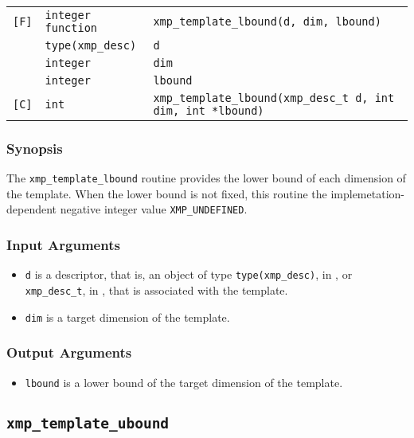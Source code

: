\begin{tabular}{lll}

\verb![F]!& {\tt integer function}& {\tt xmp\_template\_lbound(d, dim, lbound)}\\
          & {\tt type(xmp\_desc)} & {\tt d}\\
          & {\tt integer} & {\tt dim}\\
          & {\tt integer} & {\tt lbound}\\

\verb![C]!&  {\tt int}& {\tt xmp\_template\_lbound(xmp\_desc\_t d, int dim, int *lbound)}\\

\end{tabular}

\subsubsection*{Synopsis}

The {\tt xmp\_template\_lbound} routine provides the lower bound of each dimension of the template.
  When the lower bound is not fixed, this routine the implemetation-dependent negative integer value {\tt XMP\_UNDEFINED}. 

\subsubsection*{Input Arguments}
\begin{itemize}
 \item {\tt d} is a descriptor, that is, an object of type 
       {\tt type(xmp\_desc)}, in {\XMPF}, or {\tt xmp\_desc\_t},
       in {\XMPC}, that is associated with the template.
        \item {\tt dim} is a target dimension of the template.
\end{itemize}

\subsubsection*{Output Arguments}
\begin{itemize}
 \item {\tt lbound} is a lower bound of the target dimension of the template.
\end{itemize}


\subsection{\tt xmp\_template\_ubound}

